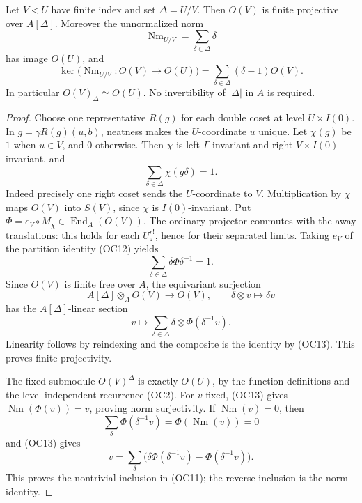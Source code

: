 \begin{srlemma}
\label{lem:ordinary-aux-projective}
Let \(V\triangleleft U\) have finite index and set \(\Delta=U/V\).
Then \(O(V)\) is finite projective over \(A[\Delta]\).  Moreover the
unnormalized norm
\[
 \operatorname{Nm}_{U/V}=\sum_{\delta\in\Delta}\delta
\]
has image \(O(U)\), and
\[
 \ker\bigl(\operatorname{Nm}_{U/V}:O(V)\to O(U)\bigr)
       =\sum_{\delta\in\Delta}(\delta-1)O(V).
 \tag{OC11}
\]
In particular \(O(V)_\Delta\simeq O(U)\).
No invertibility of \(|\Delta|\) in \(A\) is required.
\end{srlemma}

\begin{proof}
Choose one representative \(R(g)\) for each double coset at level
\(U\times I(0)\).  In
\(g=\gamma R(g)(u,b)\), neatness makes the \(U\)-coordinate \(u\)
unique.  Let \(\chi(g)\) be \(1\) when \(u\in V\), and \(0\) otherwise.
Then \(\chi\) is left \(\Gamma\)-invariant and right
\(V\times I(0)\)-invariant, and
\[
 \sum_{\delta\in\Delta}\chi(g\delta)=1.
 \tag{OC12}
\]
Indeed precisely one right coset sends the \(U\)-coordinate to \(V\).
Multiplication by \(\chi\) maps \(O(V)\) into \(S(V)\), since \(\chi\)
is \(I(0)\)-invariant.  Put
\(\Phi=e_V\circ M_\chi\in\operatorname{End}_A(O(V))\).
The ordinary projector commutes with the away translations: this
holds for each \(U_z^{r!}\), hence for their separated limits.
Taking \(e_V\) of the partition identity (OC12) yields
\[
 \sum_{\delta\in\Delta}\delta\Phi\delta^{-1}=1.
 \tag{OC13}
\]
Since \(O(V)\) is finite free over \(A\), the equivariant surjection
\[
 A[\Delta]\otimes_AO(V)\longrightarrow O(V),\qquad
 \delta\otimes v\longmapsto\delta v
\]
has the \(A[\Delta]\)-linear section
\[
 v\longmapsto
 \sum_{\delta\in\Delta}\delta\otimes\Phi(\delta^{-1}v).
\]
Linearity follows by reindexing and the composite is the identity by
(OC13).  This proves finite projectivity.

The fixed submodule \(O(V)^\Delta\) is exactly \(O(U)\), by the
function definitions and the level-independent recurrence (OC2).
For \(v\) fixed, (OC13) gives
\(\operatorname{Nm}(\Phi(v))=v\), proving norm surjectivity.
If \(\operatorname{Nm}(v)=0\), then
\[
 \sum_\delta\Phi(\delta^{-1}v)=\Phi(\operatorname{Nm}(v))=0
\]
and (OC13) gives
\[
 v=\sum_\delta
       \bigl(\delta\Phi(\delta^{-1}v)-\Phi(\delta^{-1}v)\bigr).
\]
This proves the nontrivial inclusion in (OC11); the reverse inclusion
is the norm identity.
\end{proof}

